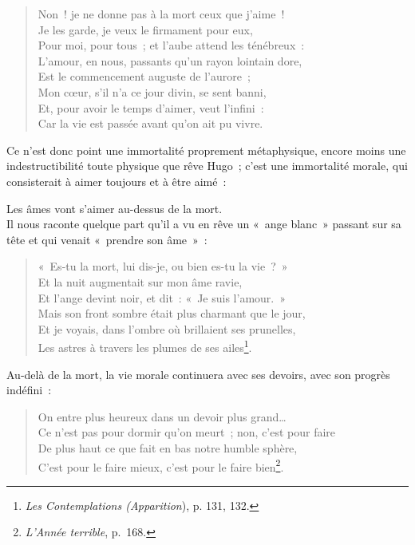 \documentclass[french,twoside]{book} %
\begin{document}
\begin{verse}
Non ! je ne donne pas à la mort ceux que j’aime !\\
Je les garde, je veux le firmament pour eux,\\
Pour moi, pour tous ; et l’aube attend les ténébreux :\\
L’amour, en nous, passants qu’un rayon lointain dore,\\
Est le commencement auguste de l’aurore ;\\
Mon cœur, s’il n’a ce jour divin, se sent banni,\\
Et, pour avoir le temps d’aimer, veut l’infini :\\
Car la vie est passée avant qu’on ait pu vivre.\\
\end{verse}

\noindent Ce n’est donc point une immortalité proprement métaphysique, encore moins une indestructibilité toute physique que rêve Hugo ; c’est une immortalité morale, qui consisterait à aimer toujours et à être aimé :\par

Les âmes vont s’aimer au-dessus de la mort.\\

\noindent Il nous raconte quelque part qu’il a vu en rêve un « ange blanc » passant sur sa tête et qui venait « prendre son âme » :\par


\begin{verse}
« Es-tu la mort, lui dis-je, ou bien es-tu la vie ? »\\
Et la nuit augmentait sur mon âme ravie,\\
Et l’ange devint noir, et dit : « Je suis l’amour. »\\
Mais son front sombre était plus charmant que le jour,\\
Et je voyais, dans l’ombre où brillaient ses prunelles,\\
Les astres à travers les plumes de ses ailes\footnote{\emph{Les Contemplations (Apparition}), p. 131, 132.}.\\
\end{verse}

\noindent Au-delà de la mort, la vie morale continuera avec ses devoirs, avec son progrès indéfini :\par


\begin{verse}
On entre plus heureux dans un devoir plus grand…\\
Ce n’est pas pour dormir qu’on meurt ; non, c’est pour faire\\
De plus haut ce que fait en bas notre humble sphère,\\
C’est pour le faire mieux, c’est pour le faire bien\footnote{\emph{L’Année terrible}, p. 168.}.\\
\end{verse}
\end{document}
